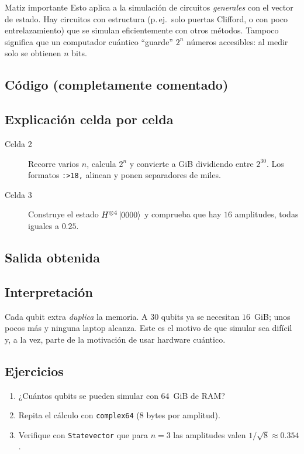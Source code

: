\begin{nota}{Matiz importante}
Esto aplica a la simulación de circuitos \emph{generales} con el vector de
estado. Hay circuitos con estructura (p.\,ej.\ solo puertas Clifford, o con
poco entrelazamiento) que se simulan eficientemente con otros métodos. Tampoco
significa que un computador cuántico ``guarde'' $2^n$ números accesibles: al
medir solo se obtienen $n$ bits.
\end{nota}

\subsection{Código (completamente comentado)}


\subsection{Explicación celda por celda}
\begin{description}
  \item[Celda 2] Recorre varios $n$, calcula $2^n$ y convierte a GiB
    dividiendo entre $2^{30}$. Los formatos \texttt{:>18,} alinean y ponen
    separadores de miles.
  \item[Celda 3] Construye el estado $H^{\otimes4}\left|0000\right\rangle$ y comprueba que
    hay $16$ amplitudes, todas iguales a $0.25$.
\end{description}

\subsection{Salida obtenida}


\subsection{Interpretación}
Cada qubit extra \emph{duplica} la memoria. A $30$ qubits ya se necesitan
$16$~GiB; unos pocos más y ninguna laptop alcanza. Este es el motivo de que
simular sea difícil y, a la vez, parte de la motivación de usar hardware
cuántico.

\subsection{Ejercicios}
\begin{enumerate}
  \item ¿Cuántos qubits se pueden simular con 64~GiB de RAM?
  \item Repita el cálculo con \texttt{complex64} (8 bytes por amplitud).
  \item Verifique con \texttt{Statevector} que para $n=3$ las amplitudes valen
    $1/\sqrt8\approx0.354$.
\end{enumerate}


